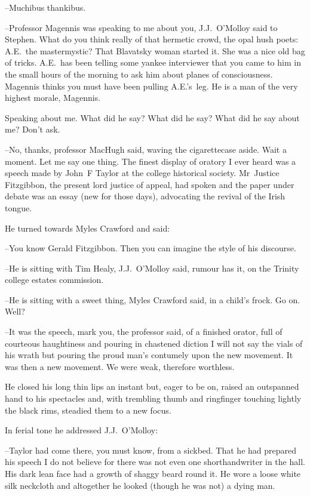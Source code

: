 --Muchibus thankibus.



--Professor Magennis was speaking to me about you,
J.J.~O'Molloy said to Stephen.
What do you think really of that hermetic crowd,
the opal hush poets:
A.E.~the mastermystic?
That Blavatsky woman started it.
She was a nice old bag of tricks.
A.E.~has been telling some yankee interviewer
that you came to him in the small hours of the morning
to ask him about planes of consciousness.
Magennis thinks you must have been pulling A.E.'s~leg.
He is a man of the very highest morale,
Magennis.

Speaking about me.
What did he say?
What did he say?
What did he say about me?
Don't ask.

--No, thanks,
professor MacHugh said,
waving the cigarettecase aside.
Wait a moment.
Let me say one thing.
The finest display of oratory I ever heard
was a speech made by John~F Taylor at the college historical society.
Mr~Justice Fitzgibbon,
the present lord justice of appeal,
had spoken
and the paper under debate was an essay (new for those days),
advocating the revival of the Irish tongue.

He turned towards Myles Crawford and said:

--You know Gerald Fitzgibbon.
Then you can imagine the style of his discourse.

--He is sitting with Tim Healy,
J.J.~O'Molloy said,
rumour has it,
on the Trinity college estates commission.

--He is sitting with a sweet thing,
Myles Crawford said,
in a child's frock.
Go on.
Well?

--It was the speech,
mark you,
the professor said,
of a finished orator,
full of courteous haughtiness and pouring in chastened diction
I will not say the vials of his wrath
but pouring the proud man's contumely upon the new movement.
It was then a new movement.
We were weak,
therefore worthless.

He closed his long thin lips an instant
but, eager to be on,
raised an outspanned hand to his spectacles
and, with trembling thumb and ringfinger touching lightly the black rims,
steadied them to a new focus.



In ferial tone
he addressed J.J.~O'Molloy:

--Taylor had come there,
you must know,
from a sickbed.
That he had prepared his speech I do not believe
for there was not even one shorthandwriter in the hall.
His dark lean face had a growth of shaggy beard round it.
He wore a loose white silk neckcloth
and altogether he looked (though he was not)
a dying man.

